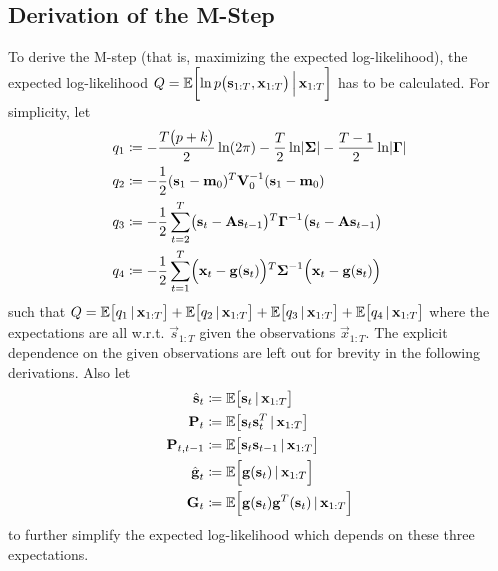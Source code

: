 	\subsection{Derivation of the M-Step}
		To derive the M-step (that is, maximizing the expected log-likelihood), the expected log-likelihood \( Q = \mathbb{E}\mathopen{}\left[ {\ln p\mathopen{}\left( {\boldsymbol{\mathrm{s}}_{1:T}, \boldsymbol{\mathrm{x}}_{1:T}}_{{}_{}}\,\negthickspace\right)\mathclose{} \,\Big\vert\, \boldsymbol{\mathrm{x}}_{1:T}}_{{}_{}}\,\negthickspace\right]\mathclose{} \) has to be calculated. For simplicity, let
		\begin{align*}
			q_1 &\coloneqq -\frac{T \paren{p + k}}{2} \ln \paren{2\pi} - \frac{T}{2} \ln \lvert \mat{\Sigma} \rvert - \frac{T - 1}{2} \ln \lvert \mat{\Gamma} \rvert \\
			q_2 &\coloneqq -\frac{1}{2} \paren{\vec{s}_1 - \vec{m}_0}^T \mat{V}_0^{-1} \paren{\vec{s}_1 - \vec{m}_0} \\
			q_3 &\coloneqq -\frac{1}{2} \sum_{t = 2}^{T} \paren{\vec{s}_t - \mat{A}\vec{s}_{t - 1}}^T \mat{\Gamma}^{-1} \paren{\vec{s}_t - \mat{A}\vec{s}_{t - 1}} \\
			q_4 &\coloneqq -\frac{1}{2} \sum_{t = 1}^{T} \paren{\vec{x}_t - \vec{g}\paren{\vec{s}_t}}^T \mat{\Sigma}^{-1} \paren{\vec{x}_t - \vec{g}\paren{\vec{s}_t}}
		\end{align*}
		such that \( Q = \mathbb{E}\mathopen{}\left[ {q_1 \,\vert\, \boldsymbol{\mathrm{x}}_{1:T}}_{{}_{}}\,\negthickspace\right]\mathclose{} + \mathbb{E}\mathopen{}\left[ {q_2 \,\vert\, \boldsymbol{\mathrm{x}}_{1:T}}_{{}_{}}\,\negthickspace\right]\mathclose{} + \mathbb{E}\mathopen{}\left[ {q_3 \,\vert\, \boldsymbol{\mathrm{x}}_{1:T}}_{{}_{}}\,\negthickspace\right]\mathclose{} + \mathbb{E}\mathopen{}\left[ {q_4 \,\vert\, \boldsymbol{\mathrm{x}}_{1:T}}_{{}_{}}\,\negthickspace\right]\mathclose{} \) where the expectations are all w.r.t. \( \vec{s}_{1:T} \) given the observations \( \vec{x}_{1:T} \). The explicit dependence on the given observations are left out for brevity in the following derivations. Also let
		\begin{align*}
			\hat{\vec{s}}_t    & \coloneqq \E\bracket{\vec{s}_t \given \vec{x}_{1:T}}                                           \\
			\mat{P}_t          & \coloneqq \E\bracket{\vec{s}_t \vec{s}_t^T \given \vec{x}_{1:T}}                               \\
			\mat{P}_{t, t - 1} & \coloneqq \E\bracket{\vec{s}_t \vec{s}_{t - 1} \given \vec{x}_{1:T}}                           \\
			\hat{\vec{g}}_t    & \coloneqq \E\bracket{\vec{g}\paren{\vec{s}_t} \given \vec{x}_{1:T}}                            \\
			\mat{G}_t          & \coloneqq \E\bracket{\vec{g}\paren{\vec{s}_t} \vec{g}^T\paren{\vec{s}_t} \given \vec{x}_{1:T}}
		\end{align*}
		to further simplify the expected log-likelihood which depends on these three expectations.
		

